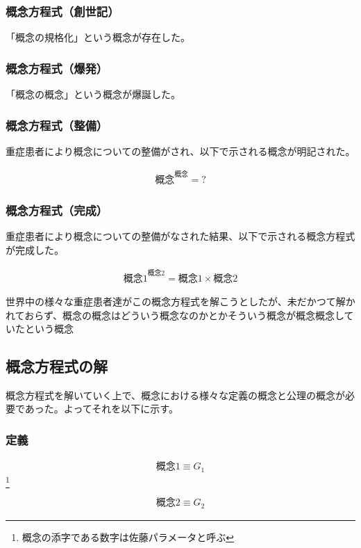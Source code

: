 \subsubsection{概念方程式（創世記）}
「概念の規格化」という概念が存在した。

\subsubsection{概念方程式（爆発）}
「概念の概念」という概念が爆誕した。

\subsubsection{概念方程式（整備）}
重症患者により概念についての整備がされ、以下で示される概念が明記された。

\begin{eqnarray}
{概念}^{概念}=?
\end{eqnarray}

\subsubsection{概念方程式（完成）}
重症患者により概念についての整備がなされた結果、以下で示される概念方程式が完成した。


\begin{eqnarray}
{概念1}^{概念2}={概念1}\times{概念2}
\end{eqnarray}

世界中の様々な重症患者達がこの概念方程式を解こうとしたが、未だかつて解かれておらず、概念の概念はどういう概念なのかとかそういう概念が概念概念していたという概念

\newpage
\subsection{概念方程式の解}
概念方程式を解いていく上で、概念における様々な定義の概念と公理の概念が必要であった。よってそれを以下に示す。

\subsubsection{定義}

\begin{eqnarray}
{概念1}\equiv G_{1}
\end{eqnarray}\footnote{概念の添字である数字は佐藤パラメータと呼ぶ}

\begin{eqnarray}
{概念2}\equiv G_{2}
\end{eqnarray}

